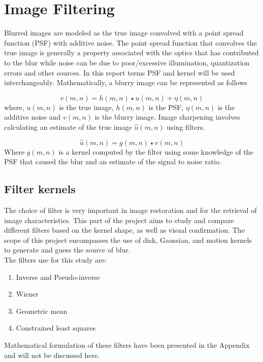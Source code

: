 \graphicspath{{mehul_pics/}}%

\section{Image Filtering}

Blurred images are modeled as the true image convolved with a point spread function (PSF) with additive noise. The point spread function that convolves the true image is generally a property associated with the optics that has contributed to the blur while noise can be due to poor/excessive illumination, quantization errors and other sources. In this report terms PSF and kernel will be used interchangeably. Mathematically, a blurry image can be represented as follows

\begin{equation}
v(m,n)= h(m,n) \star u(m,n) + \eta(m,n)
\end{equation}
where, $u(m,n)$ is the true image, $h(m,n)$ is the PSF, $\eta(m,n)$ is the additive noise and $v(m,n)$ is the blurry image. Image sharpening involves calculating an estimate of the true image $\hat{u}(m,n)$ using filters.

\begin{equation}
\hat{u}(m,n)= g(m,n) \star v(m,n)
\end{equation}
Where $g(m,n)$ is a kernel computed by the filter using some knowledge of the PSF that caused the blur and an estimate of the signal to noise ratio.

\subsection{Filter kernels}
The choice of filter is very important in image restoration and for the retrieval of image characteristics. This part of the project aims to study and compare different filters based on the kernel shape, as well as visual confirmation. The scope of this project encompasses the use of disk, Gaussian, and motion kernels to generate and guess the source of blur.\\
\noindent The filters use for this study are: 
\begin{enumerate}
\item Inverse and Pseudo-inverse
\item Wiener
\item Geometric mean
\item Constrained least squares
\end{enumerate} 
Mathematical formulation of these filters have been presented in the Appendix  and will not be discussed here. 
